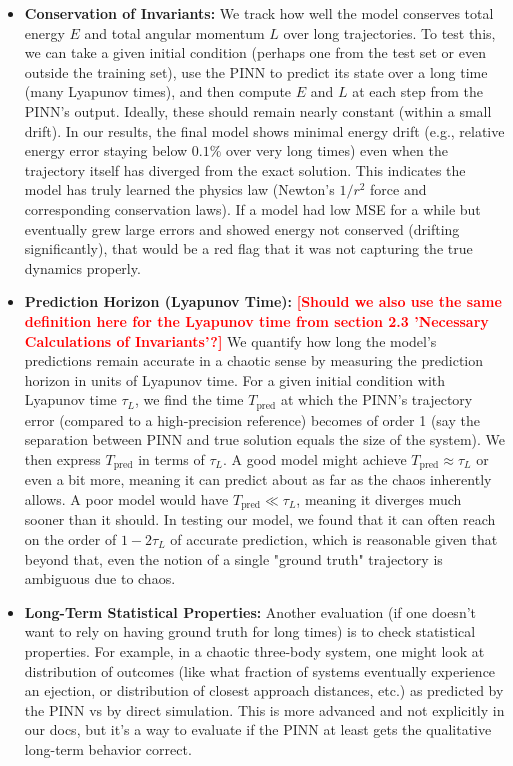 \documentclass{article}
\newcommand{\authcomment}[1]{\textcolor{Red}{\textbf{[#1]}}}
\begin{document}
\begin{itemize}

    \item \textbf{Conservation of Invariants:} We track how well the model conserves total energy $E$ and total angular momentum $L$ over long trajectories.  To test this, we can take a given initial condition (perhaps one from the test set or even outside the training set), use the PINN to predict its state over a long time (many Lyapunov times), and then compute $E$ and $L$ at each step from the PINN's output.  Ideally, these should remain nearly constant (within a small drift).  In our results, the final model shows minimal energy drift (e.g., relative energy error staying below $0.1\%$ over very long times) even when the trajectory itself has diverged from the exact solution.  This indicates the model has truly learned the physics law (Newton's $1/r^2$ force and corresponding conservation laws).  If a model had low MSE for a while but eventually grew large errors and showed energy not conserved (drifting significantly), that would be a red flag that it was not capturing the true dynamics properly. 
    
    
    
    
    \item \textbf{Prediction Horizon (Lyapunov Time):} \authcomment{Should we also use the same definition here for the Lyapunov time from section 2.3 'Necessary Calculations of Invariants'?}
    We quantify how long the model's predictions remain accurate in a chaotic sense by measuring the prediction horizon in units of Lyapunov time.  For a given initial condition with Lyapunov time $\tau_L$, 
    we find the time $T_{\text{pred}}$ at which the PINN's trajectory error (compared to a high-precision reference) becomes of order 1 (say the separation between PINN and true solution equals the size of the system).  
    We then express $T_{\text{pred}}$ in terms of $\tau_L$. A good model might achieve $T_{\text{pred}} \approx \tau_L$ or even a bit more, meaning it can predict about as far as the chaos inherently allows.  
    A poor model would have $T_{\text{pred}} \ll \tau_L$, meaning it diverges much sooner than it should.  In testing our model, we found that it can often reach on the order of $1-2\tau_L$ of accurate prediction, 
    which is reasonable given that beyond that, even the notion of a single "ground truth" trajectory is ambiguous due to chaos. 




    \item \textbf{Long-Term Statistical Properties:} Another evaluation (if one doesn't want to rely on having ground truth for long times) is to check statistical properties.  For example, in a chaotic three-body system, one might look at distribution of outcomes (like what fraction of systems eventually experience an ejection, or distribution of closest approach distances, etc.) as predicted by the PINN vs by direct simulation.  This is more advanced and not explicitly in our docs, but it's a way to evaluate if the PINN at least gets the qualitative long-term behavior correct. 
    

\end{itemize}
\end{document}
